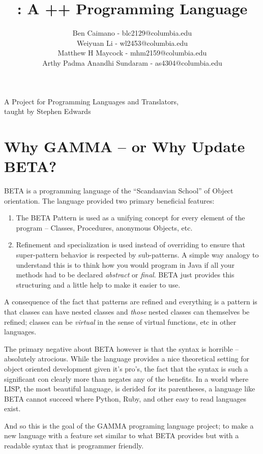 \documentclass[10pt]{article}
\title{\Lang{}: A \OLang{}++ Programming Language}
\author{
	Ben Caimano - blc2129@columbia.edu \\
	Weiyuan Li - wl2453@columbia.edu \\
	Matthew H Maycock - mhm2159@columbia.edu \\
	Arthy Padma Anandhi Sundaram - as4304@columbia.edu
}
\date{}
\newcommand{\Lang}{GAMMA}
\newcommand{\OLang}{BETA}
\begin{document}
\maketitle
\begin{center}
\large
A Project for Programming Languages and Translators,
\\taught by Stephen Edwards
\end{center}


\section*{Why \Lang{} -- or Why Update \OLang{}?}
\OLang{} is a programming language of the ``Scandanvian School'' of Object
orientation. The language provided two primary beneficial features:

\begin{enumerate}
\item The \OLang{} Pattern is used as a unifying concept for every element
of the program -- Classes, Procedures, anonymous Objects, etc.
\item Refinement and specialization is used instead of overriding to
ensure that super-pattern behavior is respected by sub-patterns. A
simple way analogy to understand this is to think how you would program
in Java if all your methods had to be declared \emph{abstract} or
\emph{final}. \OLang{} just provides this structuring and a little help to
make it easier to use.
\end{enumerate}

A consequence of the fact that patterns are refined and everything is a
pattern is that classes can have nested classes and \emph{those} nested
classes can themselves be refined; classes can be \emph{virtual} in the
sense of virtual functions, etc in other languages.

The primary negative about \OLang{} however is that the syntax is horrible
-- absolutely atrocious. While the language provides a nice theoretical
setting for object oriented development given it's pro's, the fact that
the syntax is such a significant con clearly more than negates any of
the benefits. In a world where LISP, the most beautiful language, is
derided for its parentheses, a language like \OLang{} cannot succeed
where Python, Ruby, and other easy to read languages exist.

And so this is the goal of the \Lang{} programing language project; to
make a new language with a feature set similar to what \OLang{} provides
but with a readable syntax that is programmer friendly.
\end{document}
